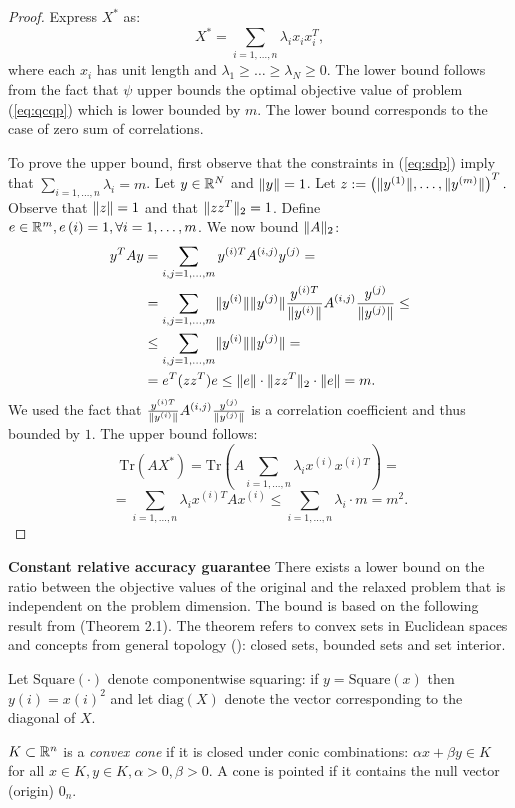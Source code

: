 \begin{proof}
Express $X^*$ as:
$$X^* =  \underset{i=1,\ldots, n}{\sum} \lambda_i x_i x_i^T,$$
where each $x_i$ has unit length and $\lambda_1 \geq \ldots \geq \lambda_N \geq 0$.
The lower bound follows from the fact that $\psi$ upper bounds the optimal objective value of problem (\ref{eq:qcqp}) which is lower bounded by $m$. The lower bound corresponds to the case of zero sum of correlations.

To prove the upper bound, first observe that the constraints in (\ref{eq:sdp}) imply that $\underset{i=1,\ldots, n}{\sum}\lambda_i = m$.
Let $y \in \mathbb{R}^{N}$ and $\lVert y\rVert = 1$. Let $z := \left(\lVert y^{(1)}\rVert, \ldots, \lVert y^{(m)}\rVert\right)^T.$ Observe that $\lVert z\rVert = 1$ and that $\lVert z z^T\rVert_2 = 1$. Define $e \in \mathbb{R}^m, e\left(i\right) = 1,  \forall i=1,\ldots,m$.
We now bound $\lVert A\rVert_2$:
\begin{align*}
  y^T A y &= \sum_{i, j = 1,\ldots,m} y^{(i)T} A^{(i,j)} y^{(j)} = \\
& = \sum_{i, j = 1,\ldots,m} \lVert y^{(i)}\rVert \lVert y^{(j)}\rVert \frac{y^{(i)T}}{\lVert y^{(i)}\rVert} A^{(i,j)} \frac{y^{(j)}}{\lVert y^{(j)}\rVert} \leq \\
&\leq \sum_{i, j = 1,\ldots,m} \lVert y^{(i)}\rVert \lVert y^{(j)}\rVert = \\
&= e^T (z z^T) e \leq \lVert e\rVert\cdot \lVert z z^T\rVert_2 \cdot \lVert e\rVert = m.
\end{align*}
We used the fact that $\frac{y^{(i)T}}{\lVert y^{(i)}\rVert} A^{(i,j)} \frac{y^{(j)}}{\lVert y^{(j)}\rVert}$ is a correlation coefficient and thus bounded by $1$.
The upper bound follows:
$$\mathrm{Tr}\left(A X^{*}\right) = \mathrm{Tr}\left(A  \underset{i=1,\ldots, n}{\sum} \lambda_i x^{(i)} x^{(i)T}\right) =$$
$$=  \underset{i=1,\ldots, n}{\sum} \lambda_i x^{(i)T} A x^{(i)} \leq \underset{i=1,\ldots, n}{\sum} \lambda_i \cdot m = m^2.$$
\end{proof}


\noindent\textbf{Constant relative accuracy guarantee}
There exists a lower bound on the ratio between the objective values of the original and the relaxed problem that is independent on the problem dimension. The bound is based on the following result from \cite{Nesterov98globalquadratic} (Theorem 2.1).  The theorem refers to convex sets in Euclidean spaces \cite{Boyd:2004:CO:993483} and concepts from general topology (\cite{bourbaki1998general}): closed sets, bounded sets and set interior.
\begin{notation}
Let $\mathrm{Square}(\cdot)$ denote componentwise squaring: if $y = \mathrm{Square}(x)$ then $y(i) = x(i)^2$ and let $\mathrm{diag}(X)$ denote the vector corresponding to the diagonal of $X$.
\end{notation}
\begin{definition}
$K \subset \mathbb{R}^n$ is a \emph{convex cone} if it is closed under conic combinations: $\alpha x + \beta y \in K$ for all $x \in K, y \in K, \alpha > 0, \beta > 0$. A cone is pointed if it contains the null vector (origin) $0_n$.
\end{definition}

